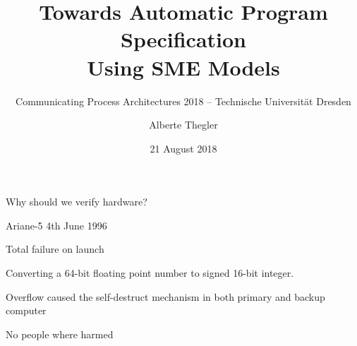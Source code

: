 \documentclass[13pt]{beamer}
\title[Towards Automatic Program Specification Using SME Models]{Towards Automatic Program Specification \\ Using SME Models}
\subtitle{\tiny Communicating Process Architectures 2018 -- Technische Universität Dresden}
\author[A. Thegler]{Alberte Thegler}
\institute[Niels Bohr Institute]{Niels Bohr Institute, University of Copenhagen, Denmark}
\date[August 21]{21 August 2018}
\begin{document}
\frame[plain]{\titlepage}


\begin{frame}{Why should we verify hardware?}
  \begin{block}{Ariane-5}
    4th June 1996
  \end{block}

  \pause

  \begin{block}{}
     Total failure on launch
  \end{block}

  \pause

  \begin{block}{}
     Converting a 64-bit floating point number to signed 16-bit integer.
  \end{block}

  \pause

  \begin{block}{}
    Overflow caused the self-destruct mechanism in both primary and backup computer
  \end{block}

  \pause

  \begin{block}{}
     No people where harmed
  \end{block}

\end{frame}
\end{document}
